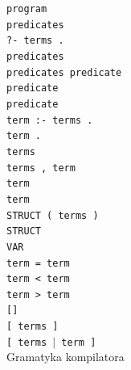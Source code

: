 \begin{algorithm}[H]
\begin{algorithmic}
\STATE \texttt{program}\\
\INDSTATE[5] \texttt{predicates}\\
\INDSTATE[5] \texttt{?- terms .}\\
\texttt{predicates}\\	 
\INDSTATE[5] \texttt{predicates predicate}\\
\INDSTATE[5] \texttt{predicate}\\
\texttt{predicate}\\		  
\INDSTATE[5] \texttt{term :- terms .}\\
\INDSTATE[5] \texttt{term .}\\
\texttt{terms} \\		 
\INDSTATE[5] \texttt{terms , term}\\
\INDSTATE[5] \texttt{term}\\
\texttt{term}\\				  
\INDSTATE[5] \texttt{STRUCT ( terms )}\\
\INDSTATE[5] \texttt{STRUCT}\\
\INDSTATE[5] \texttt{VAR}\\
\INDSTATE[5] \texttt{term = term}\\
\INDSTATE[5] \texttt{term < term}\\
\INDSTATE[5] \texttt{term > term}\\
\INDSTATE[5] \texttt{[]}\\
\INDSTATE[5] \texttt{[ terms ]}\\
\INDSTATE[5] \texttt{[ terms $\vert$ term ]}\\
\caption{Gramatyka kompilatora}
\end{algorithmic}
\end{algorithm}